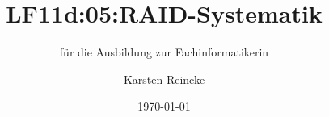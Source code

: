\documentclass[]{beamer}
\title{LF11d:05:RAID-Systematik}
\subtitle{für die Ausbildung zur Fachinformatikerin}
\institute{GS-LDK}
\author{Karsten Reincke}
\date{\today}
\def\cfgGl{../../../cfg.gl/}
\begin{document}

\begin{frame}
  \titlepage
\end{frame}






\logo{}
\newpage



%
\end{document}
